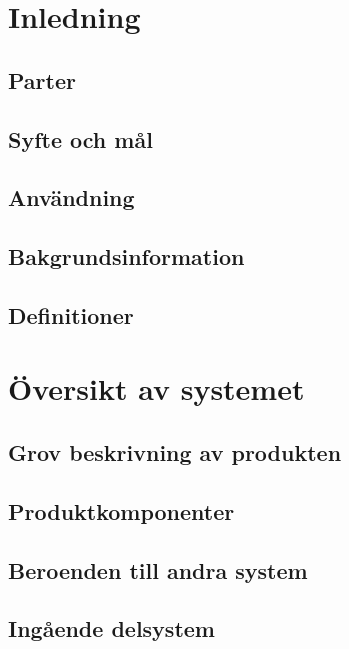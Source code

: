 \documentclass[11pt]{article}
\begin{document}
\pagebreak
{}

\begin{flushleft}

\section{Inledning}

\subsection{Parter}

\subsection{Syfte och mål}

\subsection{Användning}

\subsection{Bakgrundsinformation}

\subsection{Definitioner}

\pagebreak
\section{Översikt av systemet}

\subsection{Grov beskrivning av produkten}

\subsection{Produktkomponenter}

\subsection{Beroenden till andra system}

\subsection{Ingående delsystem}


\end{flushleft}
\end{document}

